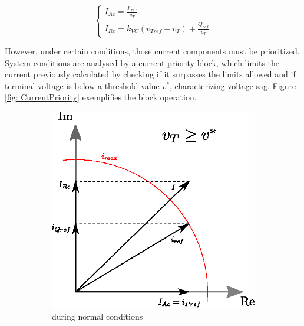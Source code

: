 \begin{equation}
	\begin{cases}
		I_{Ac} = \frac{P_{ref}}{v_{T}} \\
		I_{Re} = k_{VC}(v_{Tref} - v_{T}) + \frac{Q_{ref}}{v_{T}}
	\end{cases}
	\label{eq: Currents}
\end{equation}

However, under certain conditions, those current components must be prioritized. System conditions are analysed by a current priority block, which limits the current previously calculated by checking if it surpasses the limits allowed and if terminal voltage is below a threshold value $v^{*}$, characterizing voltage sag. Figure \ref{fig: CurrentPriority} exemplifies the block operation.

\begin{figure}[b]
	\caption{Current priority operation}
	\centering
	\begin{subfigure}[b]{0.4\textwidth}
		\centering
        \includegraphics[width=\textwidth]{Images/priority_block1.eps}
        \caption{during normal conditions}
        \label{fig: priority_normal}
	\end{subfigure}
    \begin{subfigure}[b]{0.45\textwidth}
		\centering

\end{subfigure}
\end{figure}

